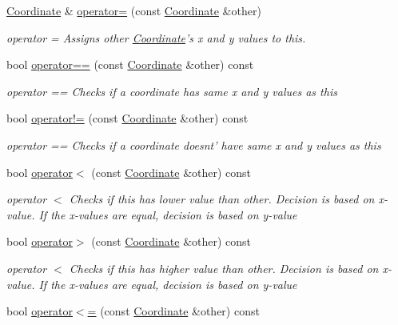 \begin{DoxyCompactItemize}
\hyperlink{classCourse_1_1Coordinate}{Coordinate} \& \hyperlink{classCourse_1_1Coordinate_a3d564384a0b5e9cf588bddb0f49f22fa}{operator=} (const \hyperlink{classCourse_1_1Coordinate}{Coordinate} \&other)
\begin{DoxyCompactList}\small\item\em operator = Assigns other \hyperlink{classCourse_1_1Coordinate}{Coordinate}'s x and y values to this. \end{DoxyCompactList}\item 
bool \hyperlink{classCourse_1_1Coordinate_a55e7cb333955be550dae69e7e32f5f47}{operator==} (const \hyperlink{classCourse_1_1Coordinate}{Coordinate} \&other) const 
\begin{DoxyCompactList}\small\item\em operator == Checks if a coordinate has same x and y values as this \end{DoxyCompactList}\item 
bool \hyperlink{classCourse_1_1Coordinate_aa7574af9c5a7ba98dfda04aebcdd9e40}{operator!=} (const \hyperlink{classCourse_1_1Coordinate}{Coordinate} \&other) const 
\begin{DoxyCompactList}\small\item\em operator == Checks if a coordinate doesnt' have same x and y values as this \end{DoxyCompactList}\item 
bool \hyperlink{classCourse_1_1Coordinate_a2db7e3cfaae46d2e963bf865911c5437}{operator$<$} (const \hyperlink{classCourse_1_1Coordinate}{Coordinate} \&other) const 
\begin{DoxyCompactList}\small\item\em operator $<$ Checks if this has lower value than other. Decision is based on x-\/value. If the x-\/values are equal, decision is based on y-\/value \end{DoxyCompactList}\item 
bool \hyperlink{classCourse_1_1Coordinate_a47cdf0172e4e421857da399624a60c93}{operator$>$} (const \hyperlink{classCourse_1_1Coordinate}{Coordinate} \&other) const 
\begin{DoxyCompactList}\small\item\em operator $<$ Checks if this has higher value than other. Decision is based on x-\/value. If the x-\/values are equal, decision is based on y-\/value \end{DoxyCompactList}\item 
bool \hyperlink{classCourse_1_1Coordinate_ae0d5b38c5e3f645576483db7f93a5e27}{operator$<$=} (const \hyperlink{classCourse_1_1Coordinate}{Coordinate} \&other) const 

\end{DoxyCompactItemize}

